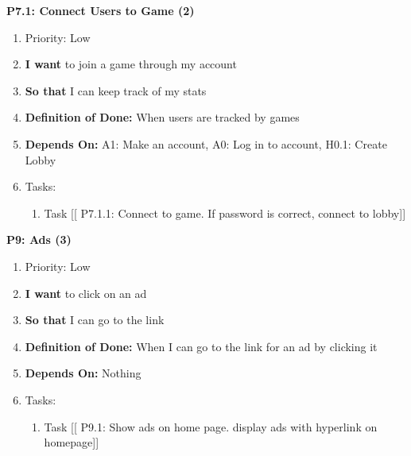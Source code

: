 \textbf{P7.1: Connect Users to Game (2)}
\begin{enumerate}
    \item Priority: Low
    \item \textbf{I want} to join a game through my account
    \item \textbf{So that} I can keep track of my stats
    \item \textbf{Definition of Done:} When users are tracked by games
    \item \textbf{Depends On:} A1: Make an account, A0: Log in to account, H0.1: Create Lobby
    \item Tasks:
    \begin{enumerate}
        \item Task [[ P7.1.1: Connect to game. If password is correct, connect to lobby]]
    \end{enumerate}
\end{enumerate}

\vspace{2em}

\textbf{P9: Ads (3)}
\begin{enumerate}
    \item Priority: Low
    \item \textbf{I want} to click on an ad
    \item \textbf{So that} I can go to the link
    \item \textbf{Definition of Done:} When I can go to the link for an ad by clicking it
    \item \textbf{Depends On:} Nothing
    \item Tasks:
    \begin{enumerate}
        \item Task [[ P9.1: Show ads on home page. display ads with hyperlink on homepage]]
    \end{enumerate}
\end{enumerate}

\vspace{2em}

